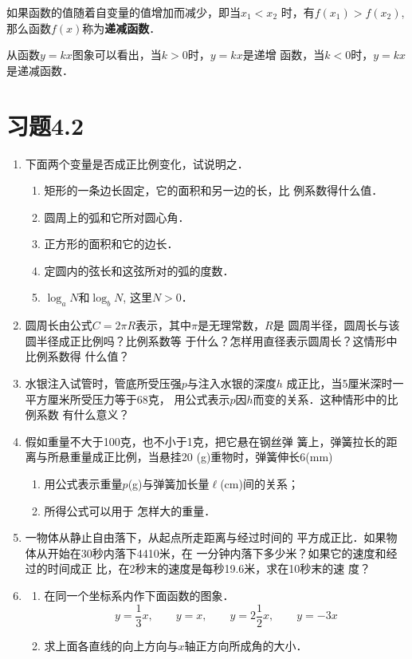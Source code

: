如果函数的值随着自变量的值增加而减少，即当$x_1<x_2$
时，有$f(x_1)>f(x_2)$, 那么函数$f(x)$称为\textbf{递减函数}．

从函数$y=kx$图象可以看出，当$k>0$时，$y=kx$是递增
函数，当$k<0$时，$y=kx$是递减函数．

\section*{习题4.2}
\begin{enumerate}
    \item   下面两个变量是否成正比例变化，试说明之．
\begin{enumerate}
\item 矩形的一条边长固定，它的面积和另一边的长，比
    例系数得什么值．
    \item 圆周上的弧和它所对圆心角．
    \item 正方形的面积和它的边长．
    \item 定圆内的弦长和这弦所对的弧的度数．
    \item $\log_a N$和$\log_b N$, 这里$N>0$．
\end{enumerate}

    \item 圆周长由公式$C=2\pi R$表示，其中$\pi$是无理常数，$R$是
    圆周半径，圆周长与该圆半径成正比例吗？比例系数等
    于什么？怎样用直径表示圆周长？这情形中比例系数得
    什么值？
    \item 水银注入试管时，管底所受压强$p$与注入水银的深度$h$
    成正比，当5厘米深时一平方厘米所受压力等于68克，
    用公式表示$p$因$h$而变的关系．这种情形中的比例系数
    有什么意义？
    \item 
    假如重量不大于100克，也不小于1克，把它悬在钢丝弹
    簧上，弹簧拉长的距离与所悬重量成正比例，当悬挂20
    (g)重物时，弹簧伸长6(mm)
\begin{enumerate}
    \item 用公式表示重量$p$(g)与弹簧加长量$\ell$(cm)间的关系；
    \item 所得公式可以用于
    怎样大的重量．
\end{enumerate}    

    \item 一物体从静止自由落下，从起点所走距离与经过时间的
    平方成正比．如果物体从开始在30秒内落下4410米，在
    一分钟内落下多少米？如果它的速度和经过的时间成正
    比，在2秒末的速度是每秒19.6米，求在10秒末的速
度？
\item \begin{enumerate}
    \item 在同一个坐标系内作下面函数的图象．
    \[y=\frac{1}{3}x,\qquad     y=x,\qquad y=2\frac{1}{2}x,\qquad     y=-3x\]
    \item 求上面各直线的向上方向与$x$轴正方向所成角的大小．
\end{enumerate} 



\end{enumerate}
